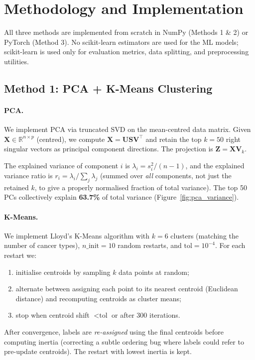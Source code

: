 \documentclass[11pt,letterpaper]{article}
\begin{document}
\section{Methodology and Implementation}
\label{sec:methodology}

All three methods are implemented from scratch in NumPy (Methods 1 \& 2) or
PyTorch (Method 3).  No scikit-learn estimators are used for the ML models;
scikit-learn is used only for evaluation metrics, data splitting, and
preprocessing utilities.

\subsection{Method 1: PCA + K-Means Clustering}
\label{sec:method1}

\paragraph{PCA.}
We implement PCA via truncated SVD on the mean-centred data matrix.
Given $\mathbf{X} \in \mathbb{R}^{n \times p}$ (centred), we compute
$\mathbf{X} = \mathbf{U}\mathbf{S}\mathbf{V}^\top$ and retain the top $k=50$
right singular vectors as principal component directions.  The projection is
$\mathbf{Z} = \mathbf{X}\mathbf{V}_k$.

The explained variance of component $i$ is $\lambda_i = s_i^2 / (n-1)$, and
the explained variance ratio is $r_i = \lambda_i / \sum_j \lambda_j$ (summed
over \emph{all} components, not just the retained $k$, to give a properly
normalised fraction of total variance).  The top 50 PCs collectively explain
\textbf{63.7\%} of total variance (Figure~\ref{fig:pca_variance}).

\paragraph{K-Means.}
We implement Lloyd's K-Means algorithm with $k = 6$ clusters
(matching the number of cancer types), $n\_\text{init} = 10$ random restarts,
and $\text{tol} = 10^{-4}$.  For each restart we:
\begin{enumerate}[leftmargin=2em,itemsep=0pt]
  \item initialise centroids by sampling $k$ data points at random;
  \item alternate between assigning each point to its nearest centroid
        (Euclidean distance) and recomputing centroids as cluster means;
  \item stop when centroid shift $< \text{tol}$ or after 300 iterations.
\end{enumerate}
After convergence, labels are \emph{re-assigned} using the final centroids
before computing inertia (correcting a subtle ordering bug where labels could
refer to pre-update centroids).  The restart with lowest inertia is kept.
\end{document}
